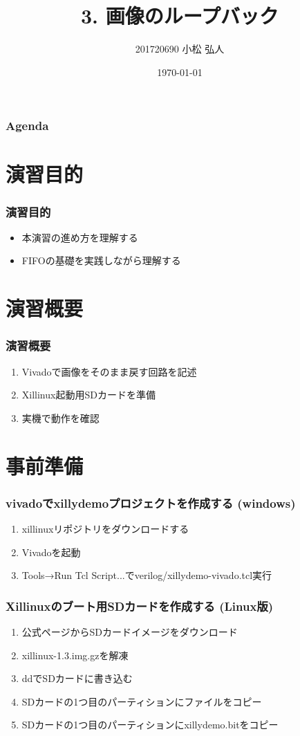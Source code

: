 ﻿\documentclass[dvipdfmx]{beamer}
\title{3. 画像のループバック}
\author{201720690 小松 弘人}
\date{\today}
\begin{document}
\maketitle

\begin{frame}
	\frametitle{Agenda}
	\tableofcontents
\end{frame}

\section{演習目的}
\begin{frame}
	\frametitle{演習目的}
	\begin{itemize}
		\item
			本演習の進め方を理解する
		\item
			FIFOの基礎を実践しながら理解する
	\end{itemize}
\end{frame}

\section{演習概要}
\begin{frame}
	\frametitle{演習概要}
	\begin{enumerate}
		\item
			Vivadoで画像をそのまま戻す回路を記述
			\vfill
		\item
			Xillinux起動用SDカードを準備
			\vfill
		\item
			実機で動作を確認
	\end{enumerate}
\end{frame}

\section{事前準備}
\begin{frame}
	\frametitle{vivadoでxillydemoプロジェクトを作成する (windows)}
	\begin{enumerate}
		\item
			xillinuxリポジトリをダウンロードする
			\vfill
		\item
			Vivadoを起動
			\vfill
		\item
			Tools→Run Tcl Script...でverilog/xillydemo-vivado.tcl実行
	\end{enumerate}
\end{frame}

\begin{frame}
	\frametitle{Xillinuxのブート用SDカードを作成する (Linux版)}
	\begin{enumerate}
		\item
			公式ページからSDカードイメージをダウンロード
			\vfill
		\item
			xillinux-1.3.img.gzを解凍
			\vfill
		\item
			ddでSDカードに書き込む
			\vfill
		\item
			SDカードの1つ目のパーティションにファイルをコピー
			\vfill
		\item
			SDカードの1つ目のパーティションにxillydemo.bitをコピー
	\end{enumerate}
\end{frame}
\end{document}
